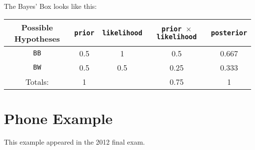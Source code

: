 The Bayes' Box looks like this:
\begin{table}[h!]
\begin{center}
\begin{tabular}{|c|c|c|c|c|}
\hline
{\bf Possible Hypotheses} & {\tt prior} & {\tt likelihood} &
{\tt prior $\times$ likelihood} & {\tt posterior}\\
\hline
{\tt BB} & 0.5 & 1   & 0.5  & 0.667\\
{\tt BW} & 0.5 & 0.5 & 0.25 & 0.333\\
\hline
Totals: & 1 & & 0.75 & 1\\
\hline
\end{tabular}
\end{center}
\end{table}


\section{Phone Example}
This example appeared in the 2012 final exam.


